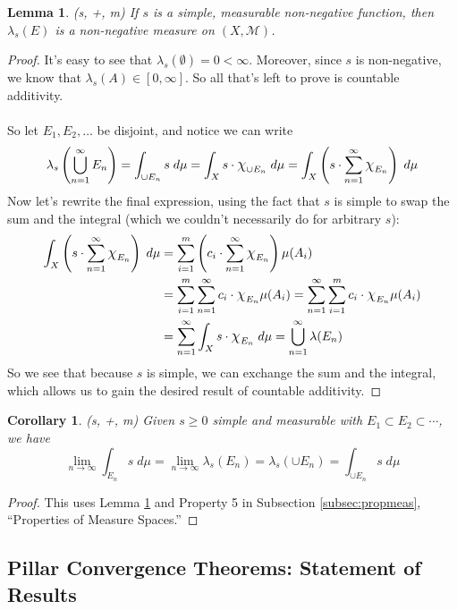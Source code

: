 \documentclass[12pt]{article}
\theoremstyle{plain}
\newtheorem{lem}[thm]{Lemma}
\newtheorem{cor}[thm]{Corollary}
\theoremstyle{definition}
\theoremstyle{remark}
\newcommand*{\Chi}{\mbox{\large$\chi$}} %
\begin{document}
\begin{lem} \emph{(s, +, m)}
\label{measurelem}
If $s$ is a simple, measurable non-negative function, then $\lambda_s(E)$ is a non-negative measure on $(X,\mathscr{M})$.
\end{lem}
\begin{proof}
It's easy to see that $\lambda_s(\emptyset) = 0<\infty$. Moreover, since $s$ is non-negative, we know that $\lambda_s(A) \in [0,\infty]$. So all that's left to prove is countable additivity.
\\
\\
So let $E_1, E_2,\ldots$ be disjoint, and notice we can write
\[
    \lambda_s\left(\bigcup^\infty_{n=1} E_n\right)
    = \int_{\cup E_n} s \;d\mu =
    \int_{X} s \cdot \Chi_{\cup E_n}\;d\mu =
    \int_{X} \left(s \cdot  
    \sum^\infty_{n=1}\Chi_{E_n}\right)\;d\mu 
\]
Now let's rewrite the final expression, using the fact that $s$ is simple to swap the sum and the integral (which we couldn't necessarily do for arbitrary $s$):
\begin{align*}
    \int_{X} \left(s \cdot  \sum^\infty_{n=1}
    \Chi_{E_n}\right)\;d\mu 
    &= \sum^m_{i=1} \left(c_i \cdot  
    \sum^\infty_{n=1}\Chi_{E_n} 
    \right)\mu(A_i) \\
    &= \sum^m_{i=1} \sum^\infty_{n=1}c_i \cdot \Chi_{E_n} 
    \mu(A_i)
    =  \sum^\infty_{n=1}\sum^m_{i=1} c_i \cdot \Chi_{E_n} 
    \mu(A_i) \\
    &=   \sum^\infty_{n=1}\int_X s \cdot \Chi_{E_n} 
        \; d\mu =  \bigcup^\infty_{n=1}\lambda(E_n)
\end{align*}
So we see that because $s$ is simple, we can exchange the sum and the integral, which allows us to gain the desired result of countable additivity.
\end{proof}

\begin{cor}
\emph{(s, +, m)}
\label{cormtc}
Given $s\geq 0$ simple and measurable with $E_1\subset E_2\subset\cdots$, we have
\[
    \lim_{n\rightarrow\infty} \int_{E_n} s\;d\mu
    = \lim_{n\rightarrow\infty} \lambda_s(E_n) =
    \lambda_s(\cup E_n) 
    = \int_{\cup E_n} s \; d\mu
\]
\end{cor}
\begin{proof}
This uses Lemma \ref{measurelem} and Property 5 in Subsection \ref{subsec:propmeas}, ``Properties of Measure Spaces.''
\end{proof}

\newpage
\subsection{Pillar Convergence Theorems: Statement of Results}
\end{document}
